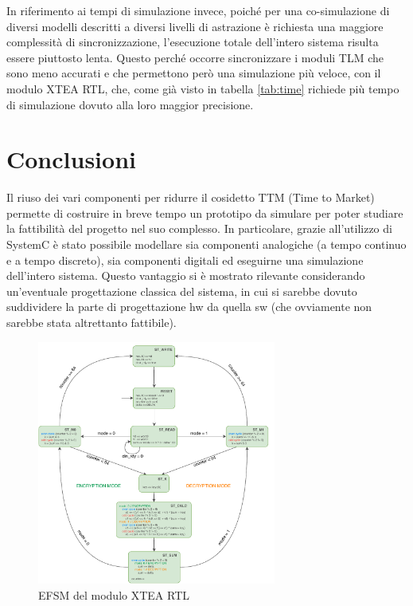 \documentclass[]{IEEEtran}
\begin{document}
In riferimento ai tempi di simulazione invece, poich\'e per una co-simulazione di diversi modelli descritti a diversi 
livelli di astrazione \`e richiesta una maggiore complessit\`a di sincronizzazione, l'esecuzione totale dell'intero 
sistema risulta essere piuttosto lenta. Questo perch\'e occorre sincronizzare i moduli TLM che sono meno accurati e che 
permettono per\`o una simulazione pi\`u veloce, con il modulo XTEA RTL, che, come gi\`a visto in tabella \ref{tab:time} 
richiede pi\`u tempo di simulazione dovuto alla loro maggior precisione.


\section{Conclusioni}
Il riuso dei vari componenti per ridurre il cosidetto TTM (Time to Market) permette di costruire in breve tempo un 
prototipo da simulare per poter studiare la fattibilit\`a del progetto nel suo complesso. In particolare, grazie 
all'utilizzo di SystemC \`e stato possibile modellare sia componenti analogiche (a tempo continuo e a tempo discreto), sia 
componenti digitali ed eseguirne una simulazione dell'intero sistema. Questo vantaggio  si \`e mostrato rilevante 
considerando un'eventuale progettazione classica del sistema, in cui si sarebbe dovuto suddividere la parte di 
progettazione hw da quella sw (che ovviamente non sarebbe stata altrettanto fattibile).





\begin{figure}[bt]
	\centering
	\includegraphics[width=0.7\textwidth]{figures/efsm.pdf}
	\caption{EFSM del modulo XTEA RTL}
	\label{fig:efsm}
\end{figure}
\end{document}
